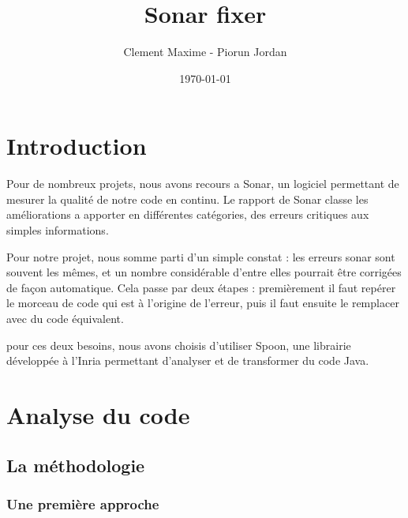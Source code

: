 \documentclass[a4paper]{article}
\begin{document}
\clearpage
\vspace*{\fill}
\begin{center}
\begin{minipage}{.6\textwidth}
\title{Sonar fixer}
\author{Clement Maxime - Piorun Jordan}
\date{\today}
\maketitle
\end{minipage}

\end{center}
\vfill %
\clearpage

\newpage

\section{Introduction}
\par Pour de nombreux projets, nous avons recours a Sonar, un logiciel permettant de mesurer la qualité de notre code en continu. Le rapport de Sonar classe les améliorations a apporter en différentes catégories, des erreurs critiques aux simples informations.
\\
\par Pour notre projet, nous somme parti d'un simple constat : les erreurs sonar sont souvent les mêmes, et un nombre considérable d'entre elles pourrait être corrigées de façon automatique. Cela passe par deux étapes : premièrement il faut repérer le morceau de code qui est à l'origine de l'erreur, puis il faut ensuite le remplacer avec du code équivalent.
\\
\par pour ces deux besoins, nous avons choisis d'utiliser Spoon, une librairie développée à l'Inria permettant d'analyser et de transformer du code Java.

\newpage
\section{Analyse du code}
\subsection{La méthodologie}
\subsubsection{Une première approche}
\end{document}
